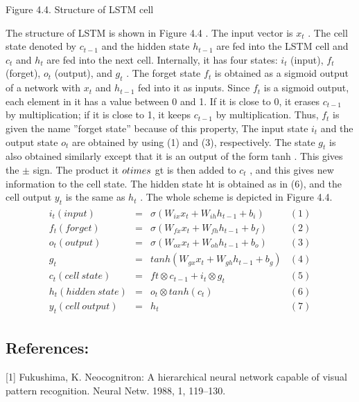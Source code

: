 \documentclass[letterpaper,10pt,english]{jupyterBook}
\begin{document}
\sphinxAtStartPar


\sphinxAtStartPar
Figure 4.4. Structure of LSTM cell

\sphinxAtStartPar
The structure of LSTM is shown in Figure 4.4 . The input vector is \(
x_t \) . The cell state denoted by  \( c_{t-1} \) and the hidden
state  \( h_{t-1} \) are fed into the LSTM cell and  \( c_t \) and
\( h_t \) are fed into the next cell. Internally, it has four states:
\( i_t \) (input),  \( f_t \) (forget),  \( o_t \) (output), and
\( g_t \) . The forget state  \( f_t \) is obtained as a sigmoid
output of a network with  \( x_t \) and  \( h_{t-1} \) fed into it
as inputs. Since  \( f_t \) is a sigmoid output, each element in it
has a value between 0 and 1. If it is close to 0, it erases  \(
c_{t-1} \) by multiplication; if it is close to 1, it  keeps  \(
c_{t-1} \) by multiplication. Thus,  \( f_t \) is given the name
”forget state” because of this property,  The input state  \( i_t \)
and the output state  \( o_t \) are obtained by using (1) and (3),
respectively. The state  \( g_t \) is also obtained similarly except
that it is an output of the form tanh . This gives the  \( \pm \)
sign. The product it  \( \\otimes \) gt is then added to  \( c_t \)
, and this gives new information to the cell state. The hidden state ht
is obtained as in (6), and the cell output  \( y_t \) is the same as
\( h_t \) . The whole scheme is depicted in Figure 4.4.
\begin{equation*}
\begin{split} 
\begin{array}{lcll}
i_t (input) &=& \sigma (W_{ix}x_t + W_{ih}h_{t-1} + b_i) &(1) \\
f_t (forget) &=& \sigma (W_{fx}x_t + W_{fh}h_{t-1} + b_f) & (2) \\
o_t (output)&=& \sigma (W_{ox}x_t + W_{oh}h_{t-1} + b_o) & (3) \\
g_t &=& tanh (W_{gx}x_t + W_{gh}h_{t-1} + b_g) & (4) \\
c_t (cell\ state) &=& ft\otimes c_{t-1} + i_t \otimes g_t & (5)\\
h_t (hidden\ state) &=& o_t \otimes tanh(c_t) &(6)\\
y_t (cell\ output) &=& h_t & (7)
\end{array}
\end{split}
\end{equation*}

\subsection{References:}
\label{\detokenize{Modelling/Neural_networks:references}}
\sphinxAtStartPar
{[}1{]} Fukushima, K. Neocognitron: A hierarchical neural network capable
of visual pattern recognition. Neural Netw. 1988, 1, 119–130.
\end{document}

